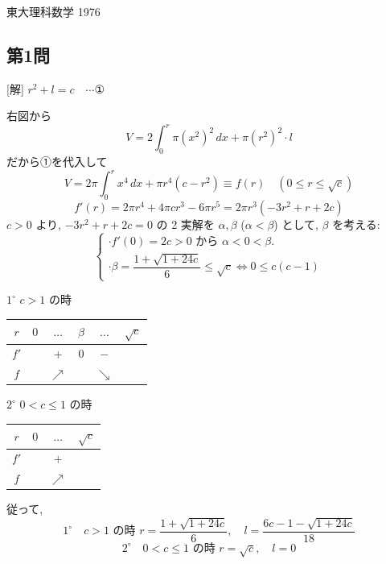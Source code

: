 \documentclass[../main.tex]{subfiles}
\begin{document}
\begin{center}
  {\Large 東大理科数学 1976}
\end{center}

\newpage

\subsection*{第1問}

[解] $r^2 + l = c \quad \cdots \text{①}$

右図から
\[
  V = 2 \int_0^r \pi (x^2)^2 \, dx + \pi (r^2)^2 \cdot l
\]
だから①を代入して
\[
  V = 2\pi \int_0^r x^4 \, dx + \pi r^4 (c - r^2) \equiv f(r) \quad (0 \le r \le \sqrt{c})
\]
\[
  f'(r) = 2\pi r^4 + 4\pi c r^3 - 6\pi r^5 = 2\pi r^3 (-3r^2 + r + 2c)
\]
$c > 0$ より, $-3r^2 + r + 2c = 0$ の 2 実解を $\alpha, \beta$ ($\alpha < \beta$) として, $\beta$ を考える:
\[
  \begin{cases}
    \cdot f'(0) = 2c > 0 \text{ から } \alpha < 0 < \beta. \\
    \cdot \beta = \dfrac{1 + \sqrt{1+24c}}{6} \le \sqrt{c} \iff 0 \le c(c-1)
  \end{cases}
\]

$1^\circ$ $c > 1$ の時

\begin{center}
  \begin{tabular}{c|c|c|c|c|c}
    $r$ & $0$ & $\dots$ & $\beta$ & $\dots$ & $\sqrt{c}$ \\ \hline
    $f'$ & & $+$ & $0$ & $-$ & \\ \hline
    $f$ & & $\nearrow$ & & $\searrow$ &
  \end{tabular}
\end{center}

$2^\circ$ $0 < c \le 1$ の時

\begin{center}
  \begin{tabular}{c|c|c|c}
    $r$ & $0$ & $\dots$ & $\sqrt{c}$ \\ \hline
    $f'$ & & $+$ & \\ \hline
    $f$ & & $\nearrow$ &
  \end{tabular}
\end{center}

従って,
\[
  1^\circ \quad c > 1 \text{ の時 } r = \frac{1 + \sqrt{1+24c}}{6}, \quad l = \frac{6c - 1 - \sqrt{1+24c}}{18}
\]
\[
  2^\circ \quad 0 < c \le 1 \text{ の時 } r = \sqrt{c}, \quad l = 0
\]
\end{document}
